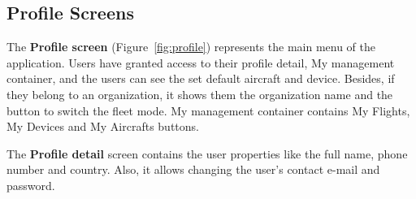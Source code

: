 \subsection{Profile Screens}\label{subsec:profile-screens}
The \textbf{Profile screen} (Figure~\ref{fig:profile}) represents the main menu of the application.
Users have granted access to their profile detail, My management container, and the users can see the set default aircraft and device.
Besides, if they belong to an organization, it shows them the organization name and the button to switch the fleet mode.
My management container contains My Flights, My Devices and My Aircrafts buttons.

The \textbf{Profile detail} screen contains the user properties like the full name, phone number and country.
Also, it allows changing the user's contact e-mail and password.



